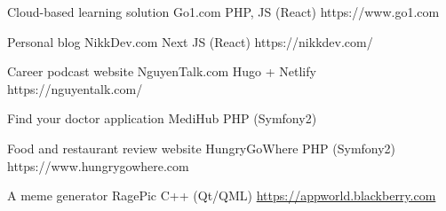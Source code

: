 \documentclass[]{awesome-cv}
\begin{document}
\begin{cventries}
	\cventry
	{Cloud-based learning solution}
	{Go1.com}
	{PHP, JS (React)}
	{https://www.go1.com}
	{}

	\vspace{-5mm}
	\cventry
	{Personal blog}
	{NikkDev.com}
	{Next JS (React)}
	{https://nikkdev.com/}
	{}

	\vspace{-5mm}
	\cventry
	{Career podcast website}
	{NguyenTalk.com}
    {Hugo + Netlify}
	{https://nguyentalk.com/}
	{}

	\vspace{-5mm}
	\cventry
	{Find your doctor application}
	{MediHub}
	{PHP (Symfony2)}
	{}
	{}

	\vspace{-5mm}
	\cventry
	{Food and restaurant review website}
	{HungryGoWhere}
	{PHP (Symfony2)}
	{https://www.hungrygowhere.com}
	{}

	\vspace{-5mm}
	\cventry
	{A meme generator}
	{RagePic}
	{C++ (Qt/QML)}
	{\href{https://appworld.blackberry.com/webstore/content/20401932}{https://appworld.blackberry.com}}
	{}

	\vspace{-5mm}
\end{cventries}
\ 
\end{document}
